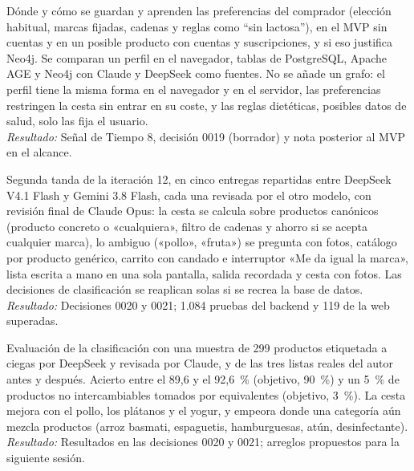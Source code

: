 \documentclass[11pt,a4paper]{article}
\newcommand{\actividad}[3]{\item[\textbf{[#1]}] #2 \\ \textit{Resultado:} #3}
\begin{document}
\begin{description}[leftmargin=0pt, itemsep=6pt]
		\actividad{Decisión}{Dónde y cómo se guardan y aprenden las preferencias del comprador (elección habitual, marcas fijadas, cadenas y reglas como ``sin lactosa''), en el MVP sin cuentas y en un posible producto con cuentas y suscripciones, y si eso justifica Neo4j. Se comparan un perfil en el navegador, tablas de PostgreSQL, Apache AGE y Neo4j con Claude y DeepSeek como fuentes. No se añade un grafo: el perfil tiene la misma forma en el navegador y en el servidor, las preferencias restringen la cesta sin entrar en su coste, y las reglas dietéticas, posibles datos de salud, solo las fija el usuario.}{Señal de Tiempo 8, decisión 0019 (borrador) y nota posterior al MVP en el alcance.}
		\actividad{Tarea}{Segunda tanda de la iteración 12, en cinco entregas repartidas entre DeepSeek V4.1 Flash y Gemini 3.8 Flash, cada una revisada por el otro modelo, con revisión final de Claude Opus: la cesta se calcula sobre productos canónicos (producto concreto o «cualquiera», filtro de cadenas y ahorro si se acepta cualquier marca), lo ambiguo («pollo», «fruta») se pregunta con fotos, catálogo por producto genérico, carrito con candado e interruptor «Me da igual la marca», lista escrita a mano en una sola pantalla, salida recordada y cesta con fotos. Las decisiones de clasificación se reaplican solas si se recrea la base de datos.}{Decisiones 0020 y 0021; 1.084 pruebas del backend y 119 de la web superadas.}
		\actividad{Análisis}{Evaluación de la clasificación con una muestra de 299 productos etiquetada a ciegas por DeepSeek y revisada por Claude, y de las tres listas reales del autor antes y después. Acierto entre el 89,6 y el 92,6~\% (objetivo, 90~\%) y un 5~\% de productos no intercambiables tomados por equivalentes (objetivo, 3~\%). La cesta mejora con el pollo, los plátanos y el yogur, y empeora donde una categoría aún mezcla productos (arroz basmati, espaguetis, hamburguesas, atún, desinfectante).}{Resultados en las decisiones 0020 y 0021; arreglos propuestos para la siguiente sesión.}
	\end{description}
\end{document}
